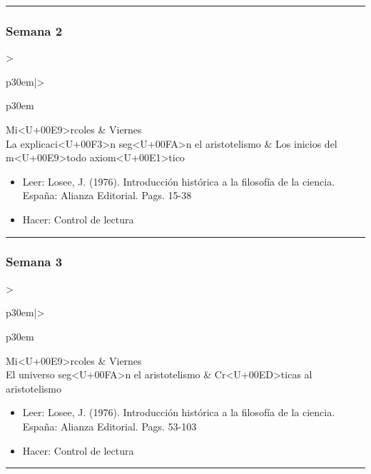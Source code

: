 \documentclass[spanish,]{article}
\begin{document}
\begin{center}\rule{0.5\linewidth}{\linethickness}\end{center}

\subsubsection{Semana 2}\label{semana-2}

\begin{tabular}{>{\raggedright\arraybackslash}p{30em}|>{\raggedright\arraybackslash}p{30em}}
\hline
Mi<U+00E9>rcoles & Viernes\\
\hline
La explicaci<U+00F3>n seg<U+00FA>n el aristotelismo & Los inicios del m<U+00E9>todo axiom<U+00E1>tico\\
\hline
\end{tabular}

\begin{itemize}
\item
  Leer: Losee, J. (1976). Introducción histórica a la filosofía de la
  ciencia. España: Alianza Editorial. Pags. 15-38
\item
  Hacer: Control de lectura
\end{itemize}

\begin{center}\rule{0.5\linewidth}{\linethickness}\end{center}

\subsubsection{Semana 3}\label{semana-3}

\begin{tabular}{>{\raggedright\arraybackslash}p{30em}|>{\raggedright\arraybackslash}p{30em}}
\hline
Mi<U+00E9>rcoles & Viernes\\
\hline
El universo seg<U+00FA>n el aristotelismo & Cr<U+00ED>ticas al aristotelismo\\
\hline
\end{tabular}

\begin{itemize}
\item
  Leer: Losee, J. (1976). Introducción histórica a la filosofía de la
  ciencia. España: Alianza Editorial. Pags. 53-103
\item
  Hacer: Control de lectura
\end{itemize}

\begin{center}\rule{0.5\linewidth}{\linethickness}\end{center}
\end{document}

